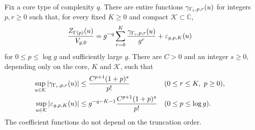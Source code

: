 \begin{prp}
\label{prp:s03:core-expansion}
Fix a core type of complexity $q$. There are entire functions
$\gamma_{\Gamma_{\rm c},p,r}(u)$ for integers $p,r\geq0$ such
that, for every fixed $K\geq0$ and compact
$\mathcal K\subset\mathbb C$,
\begin{equation}
\label{eq:s03:core-expansion}
\frac{Z_{\Gamma(p)}(u)}{V_{g,0}}
=g^{-q}\sum_{r=0}^K\frac{\gamma_{\Gamma_{\rm c},p,r}(u)}{g^r}
 +\varepsilon_{g,p,K}(u)
\end{equation}
for $0\leq p\leq\log g$ and sufficiently large $g$.
There are $C>0$ and an integer $s\geq0$, depending only on the
core, $K$ and $\mathcal K$, such that
\begin{equation}
\label{eq:s03:summable-remainder}
\begin{aligned}
\sup_{u\in\mathcal K}|\gamma_{\Gamma_{\rm c},p,r}(u)|
 &\leq\frac{C^{p+1}(1+p)^s}{p!}
       &&(0\leq r\leq K,\ p\geq0),\\
\sup_{u\in\mathcal K}|\varepsilon_{g,p,K}(u)|
 &\leq g^{-q-K-1}\frac{C^{p+1}(1+p)^s}{p!}
       &&(0\leq p\leq\log g).
\end{aligned}
\end{equation}
The coefficient functions do not depend on the truncation order.
\end{prp}
